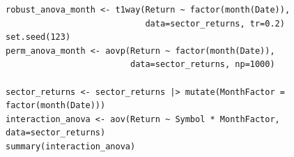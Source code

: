 \documentclass[12pt,a4paper,fleqn]{article}
\begin{document}
\begin{tcolorbox}[colback=gray!5, colframe=black!70, fontupper=\small, breakable, title=R Code]
\begin{verbatim}
robust_anova_month <- t1way(Return ~ factor(month(Date)),
                            data=sector_returns, tr=0.2)
set.seed(123)
perm_anova_month <- aovp(Return ~ factor(month(Date)), 
                         data=sector_returns, np=1000)

sector_returns <- sector_returns |> mutate(MonthFactor = factor(month(Date)))
interaction_anova <- aov(Return ~ Symbol * MonthFactor, data=sector_returns)
summary(interaction_anova)
\end{verbatim}
\end{tcolorbox}



\end{document}
